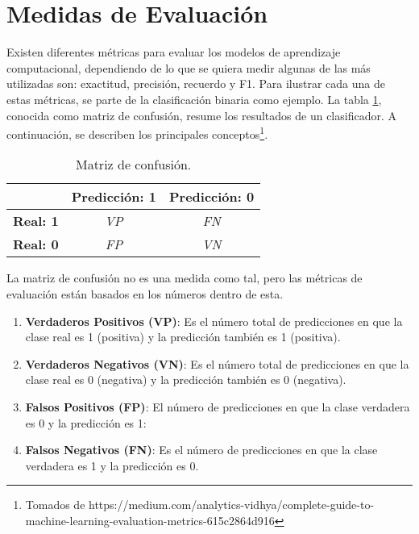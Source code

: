 \section{Medidas de Evaluación}

Existen diferentes métricas para evaluar los modelos de aprendizaje computacional, dependiendo de lo que se quiera medir algunas de las más utilizadas son: exactitud, precisión, recuerdo y F1. Para ilustrar cada una de estas métricas, se parte de la clasificación binaria como ejemplo. La tabla \ref{table:confusion}, conocida como matriz de confusión, resume los resultados de un clasificador. A continuación, se describen los principales conceptos\footnote{Tomados de https://medium.com/analytics-vidhya/complete-guide-to-machine-learning-evaluation-metrics-615c2864d916}.

\begin{table}[ht]
\caption{Matriz de confusión.}
\label{table:confusion} 
\centering 
\begin{small}
\begin{tabular}{l|c|c|}
\cline{2-3}
                                         & \multicolumn{1}{l|}{\textbf{Predicción: 1}} & \multicolumn{1}{l|}{\textbf{Predicción: 0}} \\ \hline
\multicolumn{1}{|l|}{\textbf{Real: 1}} & \textit{VP}                                 & \textit{FN}                                 \\ \hline
\multicolumn{1}{|l|}{\textbf{Real: 0}} & \textit{FP}                                 & \textit{VN}                                 \\ \hline
\end{tabular}
\end{small}
\end{table}


La matriz de confusión no es una medida como tal, pero las métricas de evaluación están basados en los números dentro de esta.



\begin{enumerate}
    \item \textbf{Verdaderos Positivos (VP)}: Es el número total de predicciones en que la clase real es 1 (positiva) y la predicción también es 1 (positiva).
    \item \textbf{Verdaderos Negativos (VN)}: Es el número total de predicciones en que la clase real es 0 (negativa) y la predicción también es 0 (negativa).
    \item \textbf{Falsos Positivos (FP)}: El número de predicciones en que la clase verdadera es 0 y la predicción es 1:
    \item \textbf{Falsos Negativos (FN)}: Es el número de predicciones en que la clase verdadera es 1 y la predicción es 0.
\end{enumerate}

